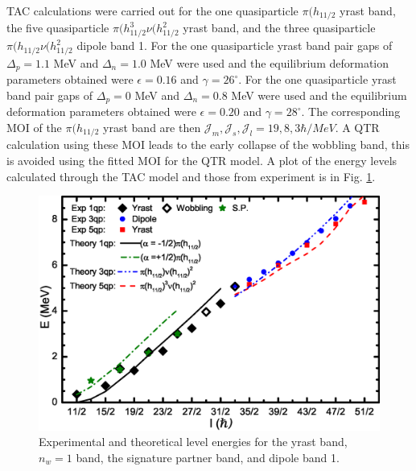 TAC calculations were carried out for the one quasiparticle $\pi(h_{11/2}$ yrast band, the five quasiparticle $\pi(h_{11/2}^3\nu(h_{11/2}^2$ yrast band, and the three quasiparticle $\pi(h_{11/2}\nu(h_{11/2}^2$ dipole band 1. For the one quasiparticle yrast band pair gaps of $\Delta_p=1.1$ MeV and $\Delta_n=1.0$ MeV were used and the equilibrium deformation parameters obtained were $\epsilon=0.16$ and $\gamma=26^{\circ}$. For the one quasiparticle yrast band pair gaps of $\Delta_p=0$ MeV and $\Delta_n=0.8$ MeV were used and the equilibrium deformation parameters obtained were $\epsilon=0.20$ and $\gamma=28^{\circ}$. The corresponding MOI of the $\pi(h_{11/2}$ yrast band are then $\mathcal{J}_m,\mathcal{J}_s,\mathcal{J}_l = 19, 8, 3 \hbar{}/MeV$. A QTR calculation using these MOI leads to the early collapse of the wobbling band, this is avoided using the fitted MOI for the QTR model. A plot of the energy levels calculated through the TAC model and those from experiment is in Fig. \ref{fig:chp4-TAC-en}.

\begin{figure}[t!]
\centerline{\includegraphics[width=\textwidth]{./img/c4/evj_new_yrast.eps}}
	\caption{Experimental and theoretical level energies for the yrast band, $n_w=1$ band, the signature partner band, and dipole band 1. \label{fig:chp4-TAC-en}}
\end{figure}

